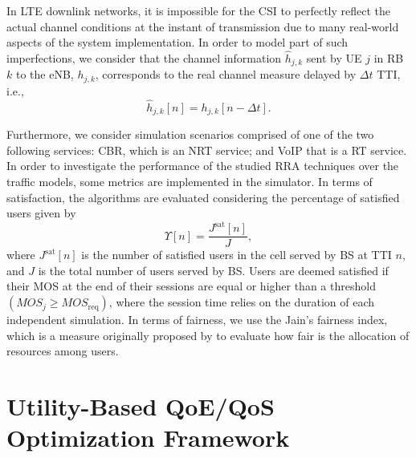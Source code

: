 \documentclass[12pt]{article}
\begin{document}
In \ac{LTE} downlink networks, it is impossible for the \ac{CSI} to perfectly reflect the actual channel conditions at the instant of transmission due to many real-world aspects of the system implementation. In order to model part of such imperfections, we consider that the channel information $ \hat{h}_{j,k} $ sent by \ac{UE} $j$ in \ac{RB} $k$ to the \ac{eNB}, $h_{j,k}$, corresponds to the real channel measure delayed by $\Delta t$ \ac{TTI}, i.e.,
%
\begin{equation}
\hat{h}_{j,k}[n] = h_{j,k}[n -\Delta t].
\end{equation}


Furthermore, we consider simulation scenarios comprised of one of the two following services: \ac{CBR}, which is an \ac{NRT} service; and \ac{VoIP} that is a \ac{RT} service. In order to investigate the performance of the studied \ac{RRA} techniques over the traffic models, some metrics are implemented in the simulator. In terms of satisfaction, the algorithms are evaluated considering the percentage of satisfied users given by
%
\begin{equation}
\label{Eq:Satisfaction}
\Upsilon[n] = \dfrac{J^{\text{sat}} [n]}{J},
\end{equation}
%
where $J^{\text{sat}} [n]$ is the number of satisfied users in the cell served by \ac{BS} at \ac{TTI} $n$, and $J$ is the total number of users served by \ac{BS}. Users are deemed satisfied if their \ac{MOS} at the end of their sessions are equal or higher than a threshold $(MOS_j \geq MOS_{\text{req}})$, where the session time relies on the duration of each independent simulation.
In terms of fairness, we use the Jain's fairness index, which is a measure originally proposed by \cite{JainTR-3011984} to evaluate how fair is the allocation of resources among users.

\section{Utility-Based QoE/QoS Optimization Framework}	
\label{Sec:UtilFramework}		
\end{document}
